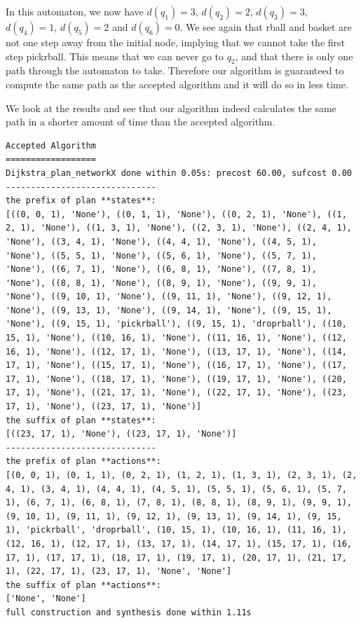 In this automaton, we now have $d(q_1)=3$, $d(q_2)=2$, $d(q_3)=3$, $d(q_4)=1$, $d(q_5) = 2$ and $d(q_6)=0$. We see again that rball and basket are not one step away from the initial node, implying that we cannot take the first step pickrball. This means that we can never go to $q_2$, and that there is only one path through the automaton to take. Therefore our algorithm is guaranteed to compute the same path as the accepted algorithm and it will do so in less time.

We look at the results and see that our algorithm indeed calculates the same path in a shorter amount of time than the accepted algorithm.

\begin{lstlisting}
Accepted Algorithm
==================
Dijkstra_plan_networkX done within 0.05s: precost 60.00, sufcost 0.00
------------------------------
the prefix of plan **states**:
[((0, 0, 1), 'None'), ((0, 1, 1), 'None'), ((0, 2, 1), 'None'), ((1, 2, 1), 'None'), ((1, 3, 1), 'None'), ((2, 3, 1), 'None'), ((2, 4, 1), 'None'), ((3, 4, 1), 'None'), ((4, 4, 1), 'None'), ((4, 5, 1), 'None'), ((5, 5, 1), 'None'), ((5, 6, 1), 'None'), ((5, 7, 1), 'None'), ((6, 7, 1), 'None'), ((6, 8, 1), 'None'), ((7, 8, 1), 'None'), ((8, 8, 1), 'None'), ((8, 9, 1), 'None'), ((9, 9, 1), 'None'), ((9, 10, 1), 'None'), ((9, 11, 1), 'None'), ((9, 12, 1), 'None'), ((9, 13, 1), 'None'), ((9, 14, 1), 'None'), ((9, 15, 1), 'None'), ((9, 15, 1), 'pickrball'), ((9, 15, 1), 'droprball'), ((10, 15, 1), 'None'), ((10, 16, 1), 'None'), ((11, 16, 1), 'None'), ((12, 16, 1), 'None'), ((12, 17, 1), 'None'), ((13, 17, 1), 'None'), ((14, 17, 1), 'None'), ((15, 17, 1), 'None'), ((16, 17, 1), 'None'), ((17, 17, 1), 'None'), ((18, 17, 1), 'None'), ((19, 17, 1), 'None'), ((20, 17, 1), 'None'), ((21, 17, 1), 'None'), ((22, 17, 1), 'None'), ((23, 17, 1), 'None'), ((23, 17, 1), 'None')]
the suffix of plan **states**:
[((23, 17, 1), 'None'), ((23, 17, 1), 'None')]
------------------------------
the prefix of plan **actions**:
[(0, 0, 1), (0, 1, 1), (0, 2, 1), (1, 2, 1), (1, 3, 1), (2, 3, 1), (2, 4, 1), (3, 4, 1), (4, 4, 1), (4, 5, 1), (5, 5, 1), (5, 6, 1), (5, 7, 1), (6, 7, 1), (6, 8, 1), (7, 8, 1), (8, 8, 1), (8, 9, 1), (9, 9, 1), (9, 10, 1), (9, 11, 1), (9, 12, 1), (9, 13, 1), (9, 14, 1), (9, 15, 1), 'pickrball', 'droprball', (10, 15, 1), (10, 16, 1), (11, 16, 1), (12, 16, 1), (12, 17, 1), (13, 17, 1), (14, 17, 1), (15, 17, 1), (16, 17, 1), (17, 17, 1), (18, 17, 1), (19, 17, 1), (20, 17, 1), (21, 17, 1), (22, 17, 1), (23, 17, 1), 'None', 'None']
the suffix of plan **actions**:
['None', 'None']
full construction and synthesis done within 1.11s 
\end{lstlisting}
